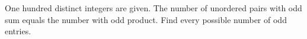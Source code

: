 One hundred distinct integers are given. The number of unordered pairs with odd sum equals the number with odd product. Find every possible number of odd entries.
